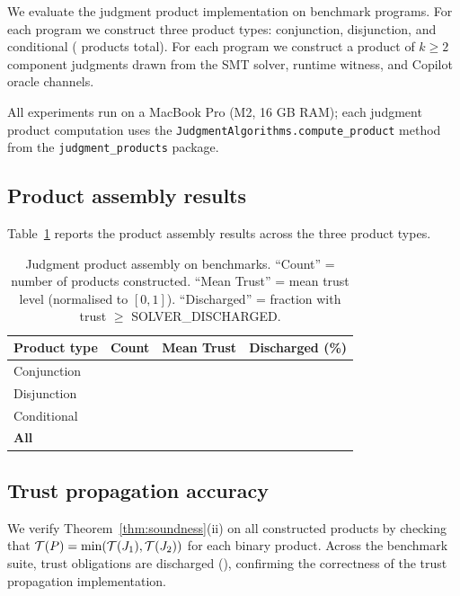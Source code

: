 \documentclass[11pt]{article}
\begin{document}
We evaluate the judgment product implementation on \ppFortyFourTotalPrograms{} benchmark
programs.  For each program we construct three product types:
conjunction, disjunction, and conditional
(\ppFortyFourTotalProducts{} products total).  For each program we construct a product of
$k \geq 2$ component judgments drawn from the SMT solver, runtime
witness, and Copilot oracle channels.

All experiments run on a MacBook Pro (M2, 16 GB RAM); each judgment
product computation uses the \texttt{JudgmentAlgorithms.compute\_product}
method from the \texttt{judgment\_products} package.

\subsection{Product assembly results}

Table~\ref{tab:results} reports the product assembly results across the
three product types.

\begin{table}[h]
\centering
\caption{Judgment product assembly on \ppFortyFourTotalPrograms{} benchmarks.
  ``Count'' = number of products constructed.
  ``Mean Trust'' = mean trust level (normalised to $[0,1]$).
  ``Discharged'' = fraction with trust $\geq$ SOLVER\_DISCHARGED.}
\label{tab:results}
\begin{tabular}{lrrr}
\toprule
\textbf{Product type} & \textbf{Count} &
  \textbf{Mean Trust} & \textbf{Discharged (\%)} \\
\midrule
Conjunction  & \ppFortyFourConjCount{}  & \ppFortyFourConjMeanTrust{}  & \ppFortyFourConjDischargedRate{} \\
Disjunction  & \ppFortyFourDisjCount{}  & \ppFortyFourDisjMeanTrust{}  & \ppFortyFourDisjDischargedRate{} \\
Conditional  & \ppFortyFourCondCount{}  & \ppFortyFourCondMeanTrust{}  & \ppFortyFourCondDischargedRate{} \\
\midrule
\textbf{All} & \ppFortyFourTotalProducts{} & \ppFortyFourMeanTrust{} & \ppFortyFourDischargedRate{} \\
\bottomrule
\end{tabular}
\end{table}

\subsection{Trust propagation accuracy}

We verify Theorem~\ref{thm:soundness}(ii) on all constructed
products by checking that $\mathcal{T}(P) = \min(\mathcal{T}(J_1), \mathcal{T}(J_2))$
for each binary product.  Across the benchmark suite,
\ppFortyFourDischargedTotal{} trust obligations are discharged
(\ppFortyFourDischargedRate{}), confirming the correctness of
the trust propagation implementation.
\end{document}
